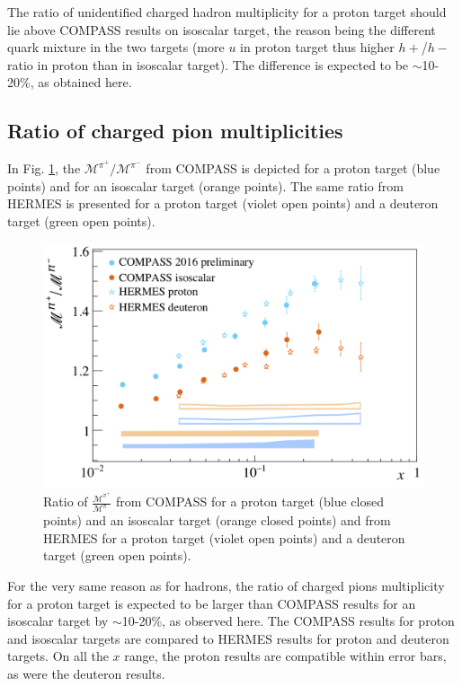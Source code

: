 The ratio of unidentified charged hadron multiplicity for a proton target should lie above COMPASS results on isoscalar target, the reason being the different quark mixture in the two targets (more $u$ in proton target thus higher $h+$/$h-$ ratio in proton than in isoscalar target). The difference is expected to be $\sim$10-20\%, as obtained here.

\newpage

\subsection{Ratio of charged pion multiplicities}

In Fig. \ref{pic:piratio}, the $\mathscr{M}^{\pi^+}/\mathscr{M}^{\pi^-}$ from COMPASS is depicted for a proton target (blue points) and for an isoscalar target (orange points). The same ratio from HERMES is presented for a proton target (violet open points) and a deuteron target (green open points).

\begin{figure}[!h]
  \centering
	\includegraphics[scale=0.5]{./gfx/pir.png}
	\caption{Ratio of $\frac{\mathscr{M}^{\pi^+}}{\mathscr{M}^{\pi^-}}$ from COMPASS for a proton target (blue closed points) and an isoscalar target (orange closed points) and from HERMES for a proton target (violet open points) and a deuteron target (green open points).}
	\label{pic:piratio}
\end{figure}

For the very same reason as for hadrons, the ratio of charged pions multiplicity for a proton target is expected to be larger than COMPASS results for an isoscalar target by $\sim$10-20\%, as observed here. The COMPASS results for proton and isoscalar targets are compared to HERMES results for proton and deuteron targets. On all the $x$ range, the proton results are compatible within error bars, as were the deuteron results.


